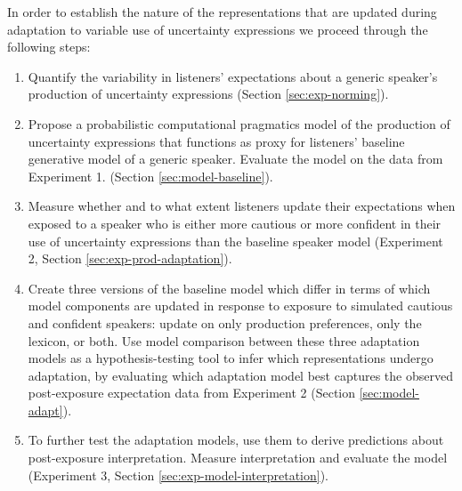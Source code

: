 \documentclass[lucida,biblatex]{sp} %
\newcommand{\sectionref}[1]{Section \ref{#1}}
\begin{document}
In order to establish the nature of the representations that are updated during adaptation to variable use of uncertainty expressions we proceed through the following steps:
\begin{enumerate}
	\item Quantify the variability in listeners' expectations about a generic speaker's production of uncertainty expressions (\sectionref{sec:exp-norming}).
	\item Propose a probabilistic computational pragmatics model of the production of uncertainty expressions that functions as proxy for listeners' baseline generative model of a generic speaker. Evaluate the model on the data from Experiment 1. (\sectionref{sec:model-baseline}).
	\item Measure whether and to what extent listeners update their expectations when exposed to a speaker who is either more cautious or more confident in their use of uncertainty expressions than the baseline speaker model (Experiment 2, \sectionref{sec:exp-prod-adaptation}).
	\item Create three versions of the baseline model which differ  in terms of which model components are updated in response to exposure to simulated cautious and confident speakers: update on only production preferences, only the lexicon, or both. Use model comparison between these three adaptation models as a hypothesis-testing tool to infer which representations undergo adaptation, by evaluating which adaptation model best captures the observed post-exposure expectation data from Experiment 2 (\sectionref{sec:model-adapt}).
	\item To further test the adaptation models, use them to derive predictions about post-exposure interpretation. Measure interpretation and evaluate the model (Experiment 3, \sectionref{sec:exp-model-interpretation}).
\end{enumerate}


\end{document}
